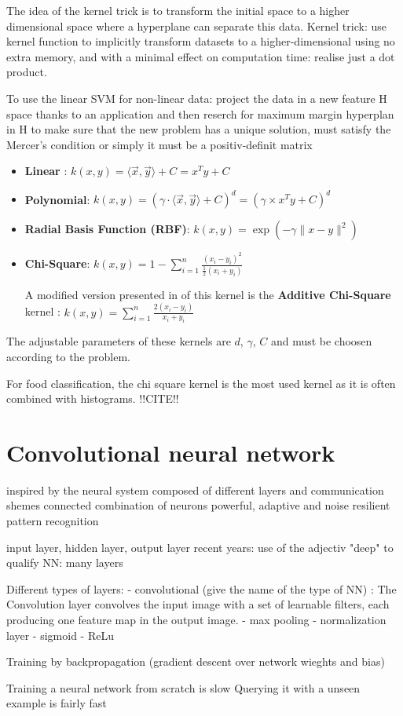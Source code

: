 The idea of the kernel trick is to transform the initial space to a higher dimensional space where a hyperplane can separate this data.
Kernel trick: use kernel function to implicitly transform datasets to a higher-dimensional using no extra memory, and with a minimal effect on computation time: realise just a dot product.

To use the linear SVM for non-linear data: project the data in a new feature H space thanks to an application and then reserch for maximum margin hyperplan in H
to make sure that the new problem has a unique solution, 
must satisfy the Mercer's condition or simply it must be a positiv-definit matrix

\begin{itemize}
    \item \textbf{Linear} : $k(x, y) = \langle \vec{x} , \vec{y} \rangle + C = x^T y + C$
    \item \textbf{Polynomial}: $k(x, y) = (\gamma \cdot \langle \vec{x} , \vec{y} \rangle + C)^d = (\gamma \times x^T y + C)^d$
    \item \textbf{Radial Basis Function (RBF)}: $k(x, y) = \exp \left( - \gamma \lVert x - y \rVert ^2 \right)$
    \item \textbf{Chi-Square}: $\displaystyle k(x, y) = 1 - \sum_{i=1}^n \frac{(x_i-y_i)^2}{\frac{1}{2} (x_i+y_i)}$
    
    A modified version presented in \cite{Vedaldi2010} of this kernel is the \textbf{Additive Chi-Square} kernel :
    $\displaystyle k(x, y) = \sum_{i=1}^n \frac{2 (x_i - y_i)}{x_i + y_i} $
\end{itemize}

The adjustable parameters of these kernels are $d$, $\gamma$, $C$ and must be choosen according to the problem.

For food classification, the chi square kernel is the most used kernel as it is often combined with histograms. !!CITE!!

\section{Convolutional neural network}

inspired by the neural system composed of different layers and communication shemes
connected combination of neurons
powerful, adaptive and noise resilient pattern recognition

input layer, hidden layer, output layer
recent years: use of the adjectiv "deep" to qualify NN: many layers

Different types of layers:
- convolutional (give the name of the type of NN) : The Convolution layer convolves the input image with a set of learnable filters, each producing one feature map in the output image.
- max pooling
- normalization layer %
- sigmoid
- ReLu

Training by  backpropagation (gradient descent over network wieghts and bias)

Training a neural network from scratch is slow
Querying it with a unseen example is fairly fast
